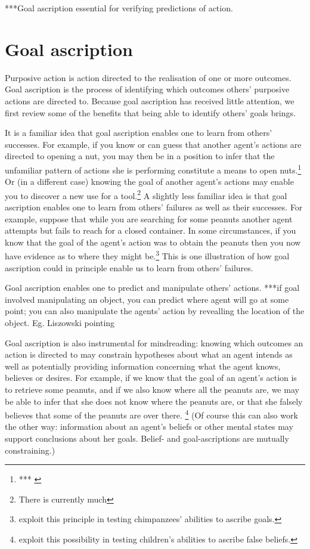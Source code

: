 \documentclass[14pt,a4paper]{extarticle}
\begin{document}
***Goal ascription essential for verifying predictions of action.

\section{Goal ascription}
Purposive action is action directed to the realisation of one or more outcomes.
Goal ascription is the process of identifying which outcomes others' purposive actions are directed to.
Because goal ascription has received little attention,
we  first review some of the benefits that being able to identify others' goals brings.

It is a familiar idea that goal ascription enables one to learn from others' successes.
For example,
if you know or can guess that another agent's actions are directed to opening a nut,
you may then be in a position to infer that the unfamiliar pattern of actions she is performing constitute a means to open nuts.\footnote{
***
\citep{Horner:2005pj}
}
Or (in a different case) knowing the goal of another agent's actions may enable you to discover a new use for a tool.\footnote{
There is currently much 
}
A slightly less familiar idea is that goal ascription enables one to learn from others' failures as well as their successes.
For example, suppose that while you are searching for some peanuts 
another agent attempts but fails to reach for a closed container.
In some circumstances,
if you know that the goal of the agent's action was to obtain the peanuts
then you now have evidence as to where they might be.\footnote{
\citet{hare_chimpanzees_2004} exploit this principle in testing chimpanzees' abilities to ascribe goals.
}
This is one illustration of how goal ascription could in principle enable us to learn from others' failures.



Goal ascription enables one
to predict and manipulate others' actions.
***if goal involved manipulating an object, you can predict where agent will go at some point; you can also manipulate the agents' action by revealling the location of the object.  Eg. Liszowski pointing


Goal ascription is also instrumental for mindreading:
knowing which outcomes an action is directed to may constrain hypotheses about what an agent intends 
as well as
potentially providing information concerning what the agent knows, believes or desires.
For example,
if we know that the goal of an agent's action is to retrieve some peanuts,
and if we also know where all the peanuts are,
we may be able to infer that she does not know where the peanuts are,
or that she falsely believes that some of the peanuts are over there.%
\footnote{
\citet{Wimmer:1998kx} exploit this possibility in testing children's abilities to ascribe false beliefs.
}
(Of course this can also work the other way:
information about an agent's beliefs or other mental states may support conclusions about her goals.
Belief- and goal-ascriptions are mutually constraining.)
\end{document}
